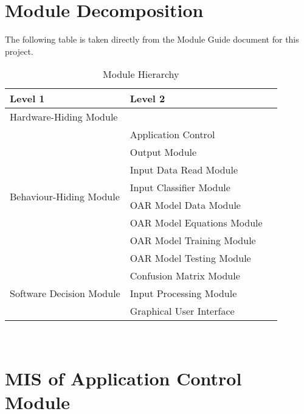 \documentclass[12pt, titlepage]{article}
\begin{document}
\section{Module Decomposition}

The following table is taken directly from the Module Guide document for this project.

\begin{table}[h!]
  \centering
  \begin{tabular}{p{} p{} p{}}
  \toprule
  \textbf{Level 1} & \textbf{Level 2}\\
  \midrule
    
  {Hardware-Hiding Module}\\
  \midrule
    
  \multirow{8}{0.3\textwidth}{Behaviour-Hiding Module}
    & Application Control \\
      \cline{2-3}
    & Output Module\\
    & Input Data Read Module \\
    & Input Classifier Module\\
      \cline{2-3}
    & OAR Model Data Module \\
    & OAR Model Equations Module \\
    & OAR Model Training Module \\
    & OAR Model Testing Module \\
    \midrule
    
    \multirow{3}{0.3\textwidth}{Software Decision Module}
      & Confusion Matrix Module \\
      \cline{2-3}
      & Input Processing Module \\
      \cline{2-3}
      & Graphical User Interface \\
    \bottomrule
    
    \end{tabular}
  \caption{Module Hierarchy}
  \label{TblMH}
  \end{table}
  
\newpage
~\newpage

\section{MIS of Application Control Module} \label{ModuleAC} 


\end{document}
